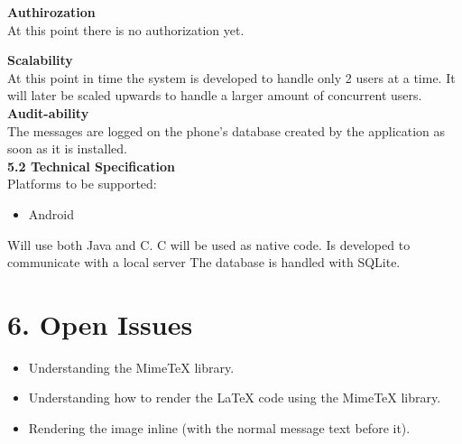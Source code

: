 \documentclass[29pt,a4paper]{moderncv}
\begin{document}
		\noindent \textbf{Authirozation}\\
		At this point there is no authorization yet.
		
		\noindent \textbf{Scalability}\\
		At this point in time the system is developed to handle only 2 users at a time. It will later be scaled upwards to handle a larger amount of concurrent users.\\
		
		
		\noindent \textbf{Audit-ability}\\
		The messages are logged on the phone’s database created by the application as soon as it is installed.\\
		
		\noindent \textbf{5.2 Technical Specification}\\
		Platforms to be supported:
		\begin{itemize}
			\item Android
		\end{itemize}
		Will use both Java and C. C will be used as native code.
		Is developed to communicate with a local server
		The database is handled with SQLite.\\
		
\newpage	
	\section*{\textbf{6. Open Issues}}
	\vspace{4mm}
		\begin{itemize}
			\item Understanding the MimeTeX library.
			\item Understanding how to render the LaTeX code using the MimeTeX library.
			\item Rendering the image inline (with the normal message text before it).
			
		\end{itemize}
	\vspace{5mm}

\newpage	
\end{document}
